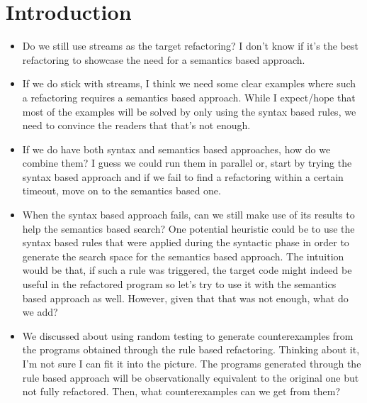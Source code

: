 \documentclass[runningheads,a4paper]{llncs}
\begin{document}
\section{Introduction}
\begin{itemize}
\item Do we still use streams as the target refactoring?
  I don't know if it's the best refactoring to showcase
  the need for a semantics based approach. 
  
\item If we do stick with streams, I think we need some clear examples where such a
  refactoring requires a semantics based approach. While I expect/hope that
  most of the examples will be solved by only using the syntax based
  rules, we need to convince the readers that that's not enough.

\item If we do have both syntax and semantics based approaches, how
  do we combine them?  I guess we could run them in parallel or, start
  by trying the syntax based approach and if we fail to find a
  refactoring within a certain timeout, move on to the semantics based
  one.

\item When the syntax based approach fails, can we still make use of
  its results to help the semantics based search?  One potential
  heuristic could be to use the syntax based rules that were applied
  during the syntactic phase in order to generate the search space for
  the semantics based approach.  The intuition would be that, if such
  a rule was triggered, the target code might indeed be useful in the
  refactored program so let's try to use it with the semantics based
  approach as well. However, given that that was not enough, what do
  we add?

\item We discussed about using random testing to generate
  counterexamples from the programs obtained through the rule based
  refactoring. Thinking about it, I'm not sure I can fit it into the
  picture. The programs generated through the rule based approach will
  be observationally equivalent to the original one but not fully
  refactored. Then, what counterexamples can we get from them?
  
\end{itemize}
\end{document}

